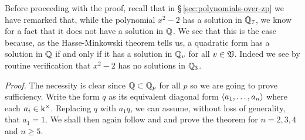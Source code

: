 Before proceeding with the proof, recall that in \S\,\ref{sec:polynomials-over-zp} we have remarked that, while the polynomial \(x^2 - 2\) has a solution in \(\mathbb{Q}_7\), we know for a fact that it does not have a solution in \(\mathbb{Q}\). We see that this is the case because, as the Hasse-Minkowski theorem tells us, a quadratic form has a solution in \(\mathbb{Q}\) if and only if it has a solution in \(\mathbb{Q}_v\) for all \(v \in \mathfrak{V}\). Indeed we see by routine verification that \(x^2 - 2\) has no solutions in \(\mathbb{Q}_3\).


\emph{Proof.} The necessity is clear since \(\mathbb{Q} \subset \mathbb{Q}_p\) for all \(p\) so we are going to prove sufficiency. Write the form \(q\) as its equivalent diagonal form \(\langle a_1, \dots, a_n \rangle\) where each \(a_i \in \mathsf{k}^{\times}\). Replacing \(q\) with \(a_1 q\), we can assume, without loss of generality, that \(a_1 = 1\). We shall then again follow \cite[pp.~41--44]{serre2012course} and \cite[pp.~102--104]{gerstein2008basic} and prove the theorem for \(n = 2, 3, 4\) and \(n \geq 5.\)

